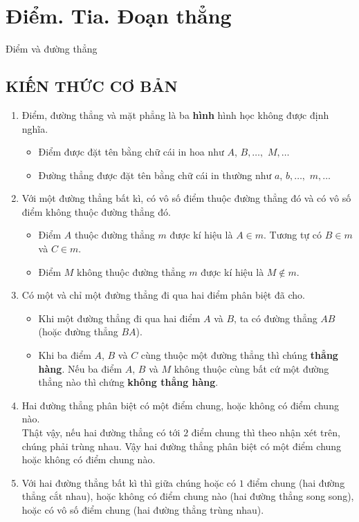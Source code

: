 \section{Điểm. Tia. Đoạn thẳng}

\begin{dang}{Điểm và đường thẳng}
	
\end{dang}

\subsection{KIẾN THỨC CƠ BẢN}

\begin{enumerate}
	\item 
	Điểm, đường thẳng và mặt phẳng là ba \textbf{hình} hình học không được định nghĩa.
	\immini
	{
		\begin{itemize}
			\item Điểm được đặt tên bằng chữ cái in hoa như $A$, $B,\ldots,$ $M,\ldots$
			\item Đường thẳng được đặt tên bằng chữ cái in thường như $a$, $b,\ldots,$ $m,\ldots$
		\end{itemize}
	}
	{
	}
	\item Với một đường thẳng bất kì, có vô số điểm thuộc đường thẳng đó và có vô số điểm không thuộc đường thẳng đó.
	\begin{itemize}
		\item Điểm $A$ thuộc đường thẳng $m$ được kí hiệu là $A\in m$. Tương tự có $B\in m$ và $C\in m$.
		\item Điểm $M$ không thuộc đường thẳng $m$ được kí hiệu là $M\notin m$.
	\end{itemize}
	\item Có một và chỉ một đường thẳng đi qua hai điểm phân biệt đã cho.
	\begin{itemize}
		\item Khi một đường thẳng đi qua hai điểm $A$ và $B$, ta có đường thẳng $AB$ (hoặc đường thẳng $BA$).
		\item Khi ba điểm $A$, $B$ và $C$ cùng thuộc một đường thẳng thì chúng \textbf{thẳng hàng}. Nếu ba điểm $A$, $B$ và $M$ không thuộc cùng bất cứ một đường thẳng nào thì chứng \textbf{không thẳng hàng}.
	\end{itemize}
	\item Hai đường thẳng phân biệt có một điểm chung, hoặc không có điểm chung nào.\\
	Thật vậy, nếu hai đường thẳng có tới $2$ điểm chung thì theo nhận xét trên, chúng phải trùng nhau. Vậy hai đường thẳng phân biệt có một điểm chung hoặc không có điểm chung nào.
	\item Với hai đường thẳng bất kì thì giữa chúng hoặc có $1$ điểm chung (hai đường thẳng cắt nhau), hoặc không có điểm chung nào (hai đường thẳng song song), hoặc có vô số điểm chung (hai đường thẳng trùng nhau).
\end{enumerate}

